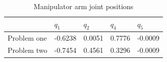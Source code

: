 \begin{table}[htb]
\caption{Manipulator arm joint positions}
\label{tab:effector}
\centering
\begin{tabular}{l|l|l|l|l|}
\cline{2-5}
                                  & $q_1$   & $q_2$  & $q_4$  & $q_5$   \\ \hline
\multicolumn{1}{|l|}{Problem one} & -0.6238 & 0.0051 & 0.7776 & -0.0009 \\ \hline
\multicolumn{1}{|l|}{Problem two} & -0.7454 & 0.4561 & 0.3296 & -0.0009 \\ \hline
\end{tabular}
\end{table}
